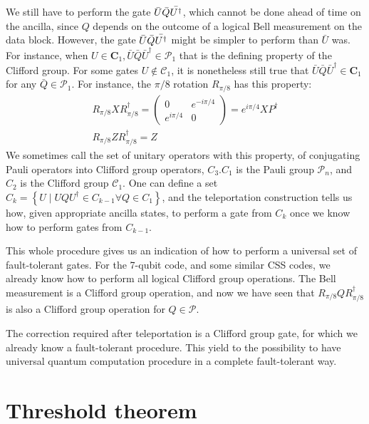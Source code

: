 We still have to perform the gate $\Bar{U} \Bar{Q}\Bar{U^{\dagger}}$, which cannot be done ahead of time on the ancilla, since $Q$ depends on the outcome of a logical Bell measurement on the data block. However, the gate $\Bar{U} \Bar{Q}\Bar{U^{\dagger}}$ might be simpler to perform than $\bar{U}$ was. For instance, when $U \in \mathbf{C}_{1}, \bar{U} \bar{Q} \bar{U}^{\dagger} \in \mathcal{P}_{1}$ that is the defining property of the Clifford group. For some gates $U \notin \mathcal{C}_{1}$, it is nonetheless still true that $\bar{U} \bar{Q} \bar{U}^{\dagger} \in \mathbf{C}_{1}$ for any $\bar{Q} \in \mathcal{P}_{1}$. For instance, the $\pi/8$ rotation $R_{\pi/8}$ has this property:
$$
\begin{array}{l}
R_{\pi / 8} X R_{\pi / 8}^{\dagger}=\left(\begin{array}{cc}
0 & e^{-i \pi / 4} \\
e^{i \pi / 4} & 0
\end{array}\right)=e^{i \pi / 4} X P^{\dagger} \\
R_{\pi / 8} Z R_{\pi / 8}^{\dagger}=Z
\end{array}
$$
We sometimes call the set of unitary operators with this property, of conjugating Pauli operators into Clifford group operators, $C_{3} . C_{1}$ is the Pauli group $\mathcal{P}_{n}$, and $C_{2}$ is the Clifford group $\mathcal{C}_{1} .$
One can define a set $C_{k}=\left\{U \mid U Q U^{\dagger} \in C_{k-1} \forall Q \in C_{1}\right\}$, and the teleportation construction tells us how, given appropriate ancilla states, to perform a gate from $C_{k}$ once we know how to perform gates from $C_{k-1}$.

This whole procedure gives us an indication of how to perform a universal set of fault-tolerant gates. For the 7-qubit code, and some similar CSS codes, we already know how to perform all logical Clifford group operations. The Bell measurement is a Clifford group operation, and now we have seen that $R_{\pi / 8} Q R_{\pi / 8}^{\dagger}$ is also a Clifford group operation for $Q \in \mathcal{P}$.  


The correction required after teleportation is a Clifford group gate, for which we already know a fault-tolerant procedure. This yield to the possibility to have universal quantum computation procedure in a complete fault-tolerant way.





\section{Threshold theorem}



